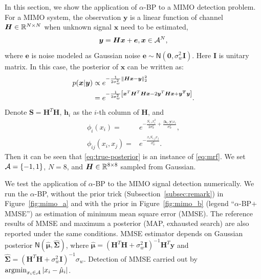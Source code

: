 In this section, we show the application of $\alpha$-BP to a MIMO detection problem. For a MIMO system, the observation $\bm{y}$ is a linear function of channel $\bm{H}\in \mathbb{R}^{N\times N}$ when unknown signal $\bm{x}$ need to be estimated,
\begin{equation}\label{eq:linear-model}
  \bm{y} = \bm{H} \bm{x} + \bm{e}, \bm{x} \in \mathcal{A}^N,
\end{equation}
where $\bm{e}$ is  noise modeled as Gaussian noise $ \bm{e} \sim \mathsf{N}\left( \bm{0}, \sigma^2_{w} \bm{I} \right)$. Here $\bm{I}$ is unitary matrix. In this case, the posterior of $\bm{x}$ can be written as:
\begin{align}\label{eq:true-posterior}
  p(\bm{x}|\bm{y}) &\propto e^{ - \frac{1}{2\sigma_w^2} \| \bm{Hx} - \bm{y} \|_{2}^2 } \nonumber \\
                   & = e^{ - \frac{1}{2\sigma_w^2}\left[ \bm{x}^{T}\bm{H}^{T}\bm{H}\bm{x} - 2 \bm{y}^T\bm{H}\bm{x}  + \bm{y^T}\bm{y}  \right] }.
\end{align}
Denote $\bm{S} = \bm{H}^T\bm{H}$, $\bm{h}_i$ as the $i$-th column of $\bm{H}$, and
\begin{align}
  \phi_{i}(x_i) =& e^{- \frac{S_{i,i} x_i^2}{2 \sigma_w^2} + \frac{\langle {\bm{h}_i, \bm{y}}\rangle x_i}{\sigma_w^2} },\nonumber \\
  \phi_{ij}(x_i, x_j) =& e^{ -\frac{x_i S_{i,j} x_j}{\sigma_w^2} }.
\end{align}
Then it can be seen that \eqref{eq:true-posterior} is an instance of \eqref{eq:mrf}. We set $\mathcal{A} = \left\{ -1, 1 \right\}$, $N = 8$, and $\bm{H}\in \mathbb{R}^{8 \times 8}$ sampled from Gaussian.

We test the application of $\alpha$-BP to the MIMO signal detection numerically. We run the $\alpha$-BP, without the prior trick (Subsection~\ref{subsec:remark}) in Figure~\ref{fig:mimo_a} and with the prior in Figure~\ref{fig:mimo_b} (legend ``$\alpha$-BP$+$MMSE'') as estimation of minimum mean square error (MMSE). The reference results of MMSE and maximum a posterior (MAP, exhausted search) are also reported under the same conditions. MMSE estimator depends on Gaussian posterior $\mathsf{N}(\hat{\bm{\mu}}, \hat{\bm{\Sigma}})$, where $\hat{\bm{\mu}} = (\bm{H}^{T}\bm{H} + \sigma_w^2 \bm{I})^{-1}\bm{H}^{T}\bm{y}$ and $\hat{\bm{\Sigma}} = (\bm{H}^{T}\bm{H} + \sigma_w^2 \bm{I})^{-1}\sigma_w$. Detection of MMSE carried out by $\operatorname{argmin}_{x_i\in \mathcal{A}}| x_i-\hat{\mu}_i |$.%

